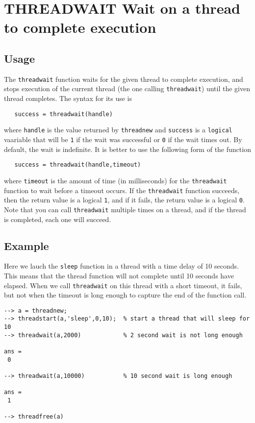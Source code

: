 \section{THREADWAIT Wait on a thread to complete execution}

\subsection{Usage}

The \verb|threadwait| function waits for the given thread to complete
execution, and stops execution of the current thread (the one calling
\verb|threadwait|) until the given thread completes.  The syntax for its
use is 
\begin{verbatim}
   success = threadwait(handle)
\end{verbatim}
where \verb|handle| is the value returned by \verb|threadnew| and \verb|success|
is a \verb|logical| vaariable that will be \verb|1| if the wait was successful
or \verb|0| if the wait times out.  By default, the wait is indefinite.  It
is better to use the following form of the function
\begin{verbatim}
   success = threadwait(handle,timeout)
\end{verbatim}
where \verb|timeout| is the amount of time (in milliseconds) for 
the \verb|threadwait| function to wait before a timeout occurs.  
If the \verb|threadwait| function succeeds, then the return 
value is a logical \verb|1|, and if it fails, the return value 
is a logical \verb|0|.  Note that you can call \verb|threadwait| multiple
times on a thread, and if the thread is completed, each one
will succeed.
\subsection{Example}

Here we lauch the \verb|sleep| function in a thread with a time delay of 
10 seconds.  This means that the thread function will not complete
until 10 seconds have elapsed.  When we call \verb|threadwait| on this
thread with a short timeout, it fails, but not when the timeout
is long enough to capture the end of the function call.
\begin{verbatim}
--> a = threadnew;
--> threadstart(a,'sleep',0,10);  % start a thread that will sleep for 10
--> threadwait(a,2000)            % 2 second wait is not long enough

ans = 
 0 

--> threadwait(a,10000)           % 10 second wait is long enough

ans = 
 1 

--> threadfree(a)
\end{verbatim}

